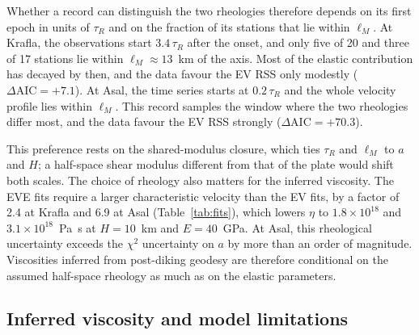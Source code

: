 \documentclass[extra]{gji}
\begin{document}
Whether a record can distinguish the two rheologies therefore depends on
its first epoch in units of $\tau_R$ and on the fraction of its stations
that lie within $\ell_M$.  At Krafla, the observations start
$3.4\,\tau_R$ after the onset, and only five of 20 and three of 17 stations
lie within $\ell_M \approx 13$~km of the axis.  Most of the elastic
contribution has decayed by then, and the data favour the EV RSS only modestly
($\Delta\mathrm{AIC} = +7.1$).  At Asal, the time series starts at
$0.2\,\tau_R$ and the whole velocity profile lies within $\ell_M$.  This
record samples the window where the two rheologies differ most, and the
data favour the EV RSS strongly ($\Delta\mathrm{AIC} = +70.3$).

This preference rests on the shared-modulus closure, which ties $\tau_R$
and $\ell_M$ to $a$ and $H$; a half-space shear modulus different from
that of the plate would shift both scales.  The choice of rheology also
matters for the inferred viscosity.  The EVE fits
require a larger characteristic velocity than the EV fits, by a factor of
2.4 at Krafla and 6.9 at Asal (Table~\ref{tab:fits}), which lowers $\eta$ to
$1.8\times10^{18}$ and $3.1\times10^{18}$~Pa~s at $H = 10$~km and
$E = 40$~GPa.  At Asal, this rheological uncertainty exceeds the $\chi^2$
uncertainty on $a$ by more than an order of magnitude.  Viscosities inferred
from post-diking geodesy are therefore conditional on the assumed
half-space rheology as much as on the elastic parameters.

\subsection{Inferred viscosity and model limitations}
\label{sec:disc_rheology}
\end{document}
